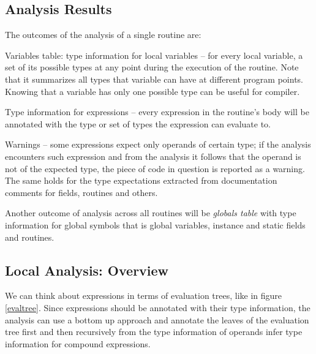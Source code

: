         \subsection{Analysis Results}
        
        The outcomes of the analysis of a single routine are:
        
        \begin{description*}
            \item[Variables table: type information for local variables] -- 
            for every local variable, a set of its possible types at any 
            point during the execution of the routine. Note that it summarizes 
            all types that variable can have at different program points. 
            Knowing that a variable has only one possible type can be useful 
            for compiler.
            
            \item[Type information for expressions] -- every expression in the 
            routine's body will be annotated with the type or set of types 
            the expression can evaluate to.
            
            \item[Warnings] -- some expressions expect only operands of 
            certain type; if the analysis encounters such expression 
            and from the analysis it follows that the operand is not of the 
            expected type, the piece of code in question is reported as a warning.
            The same holds for the type expectations extracted from 
            documentation comments for fields, routines and others.
            
        \end{description*}
        
        Another outcome of analysis across all routines will be \emph{globals table} 
        with type information for global symbols that is global variables, 
        instance and static fields and routines.
        
        \subsection{Local Analysis: Overview}
        
        We can think about expressions in terms of 
        evaluation trees, like in figure \ref{evaltree}. 
        Since expressions should be annotated with their 
        type information, the analysis can use a bottom 
        up approach and annotate the leaves of the 
        evaluation tree first and then recursively from 
        the type information of operands infer type 
        information for compound expressions.
        
